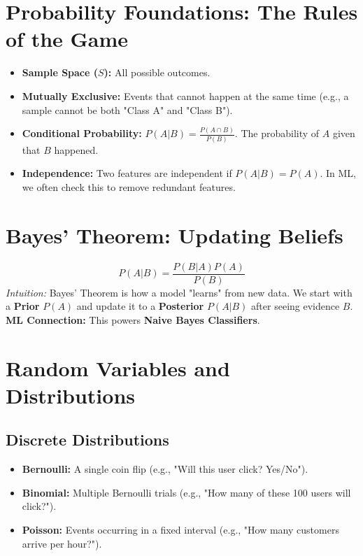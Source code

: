 \documentclass{article}
\begin{document}
\section{Probability Foundations: The Rules of the Game}
\begin{itemize}
    \item \textbf{Sample Space ($S$):} All possible outcomes.
    \item \textbf{Mutually Exclusive:} Events that cannot happen at the same time (e.g., a sample cannot be both "Class A" and "Class B").
    \item \textbf{Conditional Probability:} $P(A|B) = \frac{P(A \cap B)}{P(B)}$. The probability of $A$ given that $B$ happened.
    \item \textbf{Independence:} Two features are independent if $P(A|B) = P(A)$. In ML, we often check this to remove redundant features.
\end{itemize}

\section{Bayes' Theorem: Updating Beliefs}
\begin{equation}
    P(A|B) = \frac{P(B|A)P(A)}{P(B)}
\end{equation}
\textit{Intuition:} Bayes' Theorem is how a model "learns" from new data. We start with a \textbf{Prior} $P(A)$ and update it to a \textbf{Posterior} $P(A|B)$ after seeing evidence $B$.
\textbf{ML Connection:} This powers \textbf{Naive Bayes Classifiers}.

\section{Random Variables and Distributions}

\subsection{Discrete Distributions}
\begin{itemize}
    \item \textbf{Bernoulli:} A single coin flip (e.g., "Will this user click? Yes/No").
    \item \textbf{Binomial:} Multiple Bernoulli trials (e.g., "How many of these 100 users will click?").
    \item \textbf{Poisson:} Events occurring in a fixed interval (e.g., "How many customers arrive per hour?").
\end{itemize}
\end{document}
